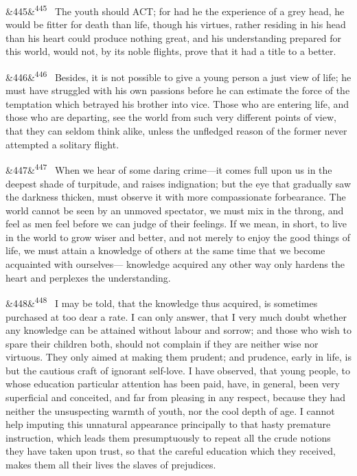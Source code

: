 \documentclass[12pt]{article}
\newcommand{\para}[1][]{\par\noindent\ifx&#1&\else\textsuperscript{\footnotesize #1}~\fi}
\begin{document}
\para[445] The youth should ACT; for had he the experience of a grey head, he would be fitter for death than life, though his virtues, rather residing in his head than his heart could produce nothing great, and his understanding prepared for this world, would not, by its noble flights, prove that it had a title to a better.

\para[446] Besides, it is not possible to give a young person a just view of life; he must have struggled with his own passions before he can estimate the force of the temptation which betrayed his brother into vice. Those who are entering life, and those who are departing, see the world from such very different points of view, that they can seldom think alike, unless the unfledged reason of the former never attempted a solitary flight.

\para[447] When we hear of some daring crime---it comes full upon us in the deepest shade of turpitude, and raises indignation; but the eye that gradually saw the darkness thicken, must observe it with more compassionate forbearance. The world cannot be seen by an unmoved spectator, we must mix in the throng, and feel as men feel before we can judge of their feelings. If we mean, in short, to live in the world to grow wiser and better, and not merely to enjoy the good things of life, we must attain a knowledge of others at the same time that we become acquainted with ourselves--- knowledge acquired any other way only hardens the heart and perplexes the understanding.

\para[448] I may be told, that the knowledge thus acquired, is sometimes purchased at too dear a rate. I can only answer, that I very much doubt whether any knowledge can be attained without labour and sorrow; and those who wish to spare their children both, should not complain if they are neither wise nor virtuous. They only aimed at making them prudent; and prudence, early in life, is but the cautious craft of ignorant self-love. I have observed, that young people, to whose education particular attention has been paid, have, in general, been very superficial and conceited, and far from pleasing in any respect, because they had neither the unsuspecting warmth of youth, nor the cool depth of age. I cannot help imputing this unnatural appearance principally to that hasty premature instruction, which leads them presumptuously to repeat all the crude notions they have taken upon trust, so that the careful education which they received, makes them all their lives the slaves of prejudices.
\end{document}

